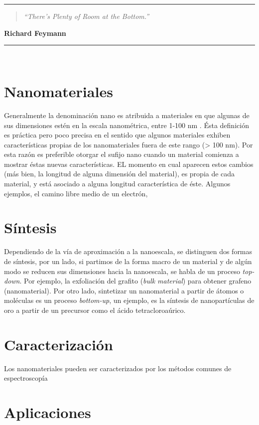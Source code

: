 \noindent
\rule{\linewidth}{1 pt}
\begin{flushright}
	\begin{quotation}
		\small{
			\textit{``There’s Plenty of Room at the Bottom.''}}
	\end{quotation}
	\bf{Richard Feymann}
\end{flushright}
\noindent
\rule{\linewidth}{1 pt}\\
\vfill
\section{Nanomateriales}
Generalmente la denominación nano es atribuida a materiales en que algunas de sus dimensiones estén en la escala nanométrica, entre 1-100 nm \cite{Gressler2013}. Ésta definición es práctica pero poco precisa en el sentido que algunos materiales exhiben características propias de los nanomateriales fuera de este rango (> 100 nm). Por esta razón es preferible otorgar el sufijo nano cuando un material comienza a mostrar éstas nuevas características. EL momento en cual aparecen estos cambios (más bien, la longitud de alguna dimensión del material), es propia de cada material, y está asociado a alguna longitud característica de éste. Algunos ejemplos, el camino libre medio de un electrón, 

\section{Síntesis}
Dependiendo de la vía de aproximación a la nanoescala, se distinguen dos formas de síntesis, por un lado, si partimos de la forma macro de un material y de algún modo se reducen sus dimensiones hacia la nanoescala, se habla de un proceso \textit{top-down}. Por ejemplo, la exfoliación del grafito (\textit{bulk material}) para obtener grafeno (nanomaterial).  Por otro lado, sintetizar un nanomaterial a partir de átomos o moléculas es un proceso \textit{bottom-up}, un ejemplo, es la síntesis de nanopartículas de oro a partir de un precursor como el ácido tetracloroaúrico.

\section{Caracterización}
Los nanomateriales pueden ser caracterizados por los métodos comunes de espectroscopía
\section{Aplicaciones}
